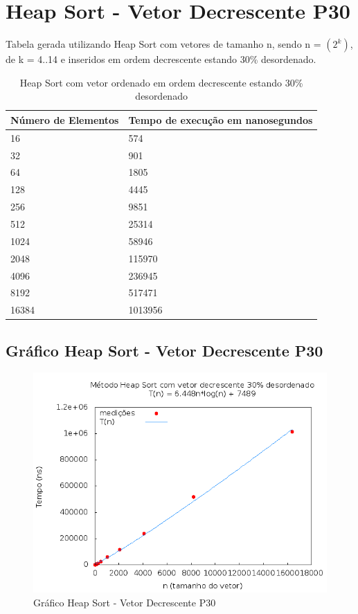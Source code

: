 \documentclass[12pt,a4paper,twoside]{report}
\begin{document}
\section{Heap Sort - Vetor Decrescente P30}
Tabela gerada utilizando Heap Sort com vetores de tamanho n, sendo n = $(2^k)$, de k = 4..14 e inseridos em ordem decrescente estando 30\% desordenado.
\begin{table}[H]
\centering
\caption{Heap Sort com vetor ordenado em ordem decrescente estando 30\% desordenado}
\label{my-label}
\begin{tabular}{|l|l|}
\hline
\multicolumn{1}{|c|}{\textbf{Número de Elementos}} & \multicolumn{1}{c|}{\textbf{Tempo de execução em nanosegundos}} \\ \hline
16 & 574 \\ \hline
32 & 901 \\ \hline
64 & 1805 \\ \hline
128 & 4445 \\ \hline
256 & 9851 \\ \hline
512 & 25314 \\ \hline
1024 & 58946 \\ \hline
2048 & 115970 \\ \hline
4096 & 236945 \\ \hline
8192 & 517471 \\ \hline
16384 & 1013956 \\ \hline
\end{tabular}
\end{table}

\subsection{Gráfico Heap Sort - Vetor Decrescente P30}
\begin{figure}[H]
    \centering
    \includegraphics[width=0.7\linewidth]{graficos/HeapSort/vIntDecrescenteP30/vIntDecrescenteP30.png}
  \caption{Gráfico Heap Sort - Vetor Decrescente P30}
\end{figure}
\end{document}
